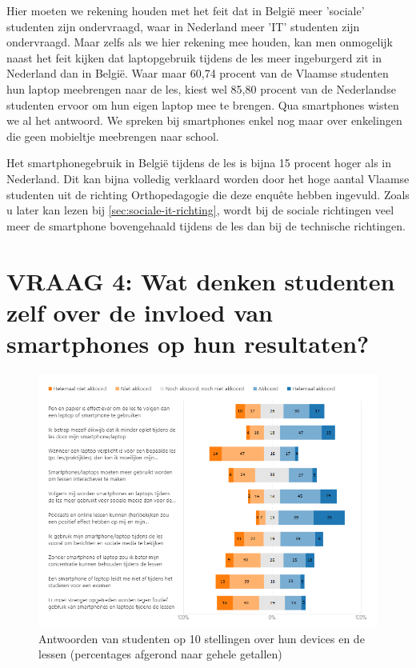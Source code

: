 Hier moeten we rekening houden met het feit dat in België meer 'sociale' studenten zijn ondervraagd, waar in Nederland meer 'IT' studenten zijn ondervraagd. Maar zelfs als we hier rekening mee houden, kan men onmogelijk naast het feit kijken dat laptopgebruik tijdens de les meer ingeburgerd zit in Nederland dan in België. Waar maar 60,74 procent van de Vlaamse studenten hun laptop meebrengen naar de les, kiest wel 85,80 procent van de Nederlandse studenten ervoor om hun eigen laptop mee te brengen. Qua smartphones wisten we al het antwoord. We spreken bij smartphones enkel nog maar over enkelingen die geen mobieltje meebrengen naar school.

Het smartphonegebruik in België tijdens de les is bijna 15 procent hoger als in Nederland. Dit kan bijna volledig verklaard worden door het hoge aantal Vlaamse studenten uit de richting Orthopedagogie die deze enquête hebben ingevuld. Zoals u later kan lezen bij \ref{sec:sociale-it-richting}, wordt bij de sociale richtingen veel meer de smartphone bovengehaald tijdens de les dan bij de technische richtingen. 

\section{VRAAG 4: Wat denken studenten zelf over de invloed van smartphones op hun resultaten?}
\label{sec:invloed-resultaten}

\begin{figure}
	\includegraphics[width=\textwidth]
	{img/stellingen.png}
	\caption{Antwoorden van studenten op 10 stellingen over hun devices en de lessen (percentages afgerond naar gehele getallen)}
	\label{fig:stellingen}
\end{figure}

